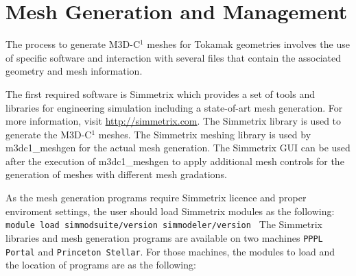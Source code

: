 \section{Mesh Generation and Management}

The process to generate M3D-C$^{1}$ meshes for Tokamak geometries involves the use of specific software and interaction with several files that contain the associated geometry and mesh information.

The first required software is Simmetrix which provides a set of tools and libraries for engineering simulation including a state-of-art mesh generation. For more information, visit \href{http://simmetrix.com}{http://simmetrix.com}. The Simmetrix library is used to generate the M3D-C$^{1}$ meshes. The Simmetrix meshing library is used by m3dc1\_meshgen for the actual mesh generation. The Simmetrix GUI can be used after the execution of m3dc1\_meshgen to apply additional mesh controls for the generation of meshes with different mesh gradations. 

As the mesh generation programs require Simmetrix licence and proper enviroment settings, the user should load Simmetrix modules as the following:
\newline\newline
\texttt{
module load simmodsuite/version simmodeler/version
}
\newline\newline
The Simmetrix libraries and mesh generation programs are available on two machines \texttt{PPPL Portal} and \texttt{Princeton Stellar}. For those machines, the modules to load and the location of programs are as the following:

